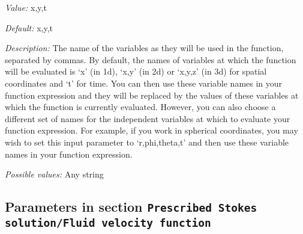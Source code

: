 \begin{itemize}
{\it Value:} x,y,t


{\it Default:} x,y,t


{\it Description:} The name of the variables as they will be used in the function, separated by commas. By default, the names of variables at which the function will be evaluated is `x' (in 1d), `x,y' (in 2d) or `x,y,z' (in 3d) for spatial coordinates and `t' for time. You can then use these variable names in your function expression and they will be replaced by the values of these variables at which the function is currently evaluated. However, you can also choose a different set of names for the independent variables at which to evaluate your function expression. For example, if you work in spherical coordinates, you may wish to set this input parameter to `r,phi,theta,t' and then use these variable names in your function expression.


{\it Possible values:} Any string
\end{itemize}

\subsection{Parameters in section \tt Prescribed Stokes solution/Fluid velocity function}
\label{parameters:Prescribed_20Stokes_20solution/Fluid_20velocity_20function}

